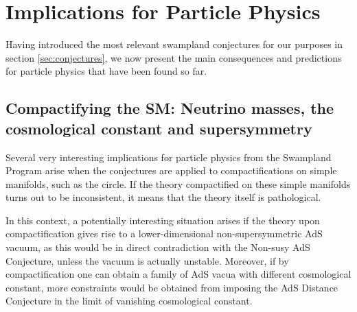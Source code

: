 \documentclass[11pt,a4paper]{article}
\begin{document}




\section{Implications for Particle Physics}
\label{sec:implicationsPP}


Having introduced the most relevant swampland conjectures for our purposes in section \ref{sec:conjectures}, we now present the main consequences and predictions for particle physics that have been found so far.


\subsection{Compactifying the SM: Neutrino masses, the cosmological constant and supersymmetry}
\label{ss:SMcompactifications}

Several very interesting implications for particle physics from the Swampland Program arise when the conjectures are applied to compactifications on simple manifolds, such as the circle.
If the theory compactified on these simple manifolds turns out to be inconsistent, it means that the theory itself is pathological.  

In this context, a potentially interesting situation arises if the theory upon compactification gives rise to a lower-dimensional non-supersymmetric AdS vacuum, as this would be in direct contradiction with the Non-susy AdS Conjecture, unless the vacuum is actually unstable.
 Moreover, if by compactification one can obtain a family of AdS vacua with different cosmological constant, more constraints would be obtained from imposing the AdS Distance Conjecture in the limit of vanishing cosmological constant.
\end{document}
